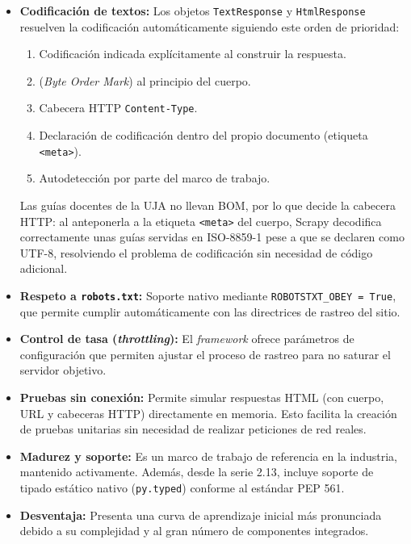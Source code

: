 \begin{itemize}                                                                                                                                                    
  \item \textbf{Codificación de textos:} Los objetos \texttt{TextResponse} y \texttt{HtmlResponse} resuelven la codificación automáticamente siguiendo este orden de prioridad:
        \begin{enumerate}                                                                                                                                                    
          \item Codificación indicada explícitamente al construir la respuesta.
          \item {} (\textit{Byte Order Mark}) al principio del cuerpo.
          \item Cabecera HTTP \texttt{Content-Type}.
          \item Declaración de codificación dentro del propio documento (etiqueta \texttt{<meta>}).
          \item Autodetección por parte del marco de trabajo.
        \end{enumerate}
        Las guías docentes de la UJA no llevan BOM, por lo que decide la cabecera HTTP: al anteponerla a la etiqueta \texttt{<meta>} del cuerpo, Scrapy decodifica correctamente unas guías servidas en ISO-8859-1 pese a que se declaren como UTF-8, resolviendo el problema de codificación sin necesidad de código adicional.
        
  \item \textbf{Respeto a \texttt{robots.txt}:} Soporte nativo mediante \texttt{ROBOTSTXT\_OBEY = True}, que permite cumplir automáticamente con las directrices de rastreo del sitio.
        
  \item \textbf{Control de tasa (\textit{throttling}):} El \textit{framework} ofrece parámetros de configuración que permiten ajustar el proceso de rastreo para no saturar el servidor objetivo.
        
  \item \textbf{Pruebas sin conexión:} Permite simular respuestas HTML (con cuerpo, URL y cabeceras HTTP) directamente en memoria. Esto facilita la creación de pruebas unitarias sin necesidad de realizar peticiones de red reales.
        
  \item \textbf{Madurez y soporte:} Es un marco de trabajo de referencia en la industria, mantenido activamente. Además, desde la serie 2.13, incluye soporte de tipado estático nativo (\texttt{py.typed}) conforme al estándar PEP 561.\cite{scrapydocs}
        
  \item \textbf{Desventaja:} Presenta una curva de aprendizaje inicial más pronunciada debido a su complejidad y al gran número de componentes integrados.
\end{itemize}


